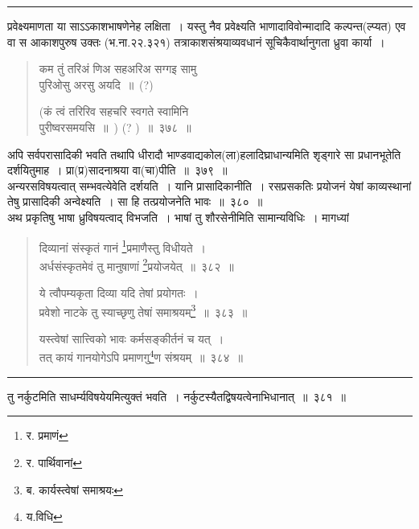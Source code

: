 \documentclass[11pt, openany]{book}
\begin{document}
\hrule

\vspace{2mm}
\noindent
प्रवेक्ष्यमाणता या साऽऽकाशभाषणेनेह लक्षिता~। यस्तु नैव प्रवेक्ष्यति भाणादाविवोन्मादादि कल्पन्त(ल्प्यत) एव वा स आकाशपुरुष उक्तः (भ.ना.२२.३२१) तत्राकाशसंश्रयाव्यवधानं सूचिकैवार्थानुगता ध्रुवा कार्या~।

\begin{quote}
{\qt कम तुं तरिअं णिअ सहअरिअ सग्गइ सामु \\
 पुरिओसु अरसु अयदि~॥~(?) 

 (कं त्वं तरिरिव सहचरि स्वगते स्वामिनि \\
 पुरीष्वरसमयसि~॥~) (? )~॥~३७८~॥}
\end{quote}

अपि सर्वपरासादिकी भवति तथापि धीरादौ भाण्डवाद्यकोल(ला)हलादिघ्राधान्यमिति शृड्गारे सा प्रधानभूतेति दर्शयितुमाह~। {\qtt प्रा(प्र)सादनाश्रया वा(चा)पीति}~॥~३७९~॥\\

अन्यरसविषयत्वात् सम्भवत्येवेति दर्शयति~। {\qtt यानि प्रासादिकानीति}~। रसप्रसकतिः प्रयोजनं येषां काव्यस्थानां तेषु प्रासादिकी अन्वेक्ष्यति~। सा हि तत्प्रयोजनेति भावः~॥~३८०~॥\\

अथ प्रकृतिषु भाषा ध्रुविषयत्वाद् विभजति~। {\qtt भाषां तु शौरसेनीमिति} सामान्यविधिः~। मागध्यां 

\newpage

\begin{quote}
{\na दिव्यानां संस्कृतं गानं \renewcommand{\thefootnote}{1}\footnote{र. प्रमाणं}प्रमाणैस्तु विधीयते~। \\
 अर्धसंस्कृतमेवं तु मानुषाणां \renewcommand{\thefootnote}{2}\footnote{र. पार्थिवानां}प्रयोजयेत्~॥~३८२~॥

 ये त्वौपम्यकृता दिव्या यदि तेषां प्रयोगतः~।\\
 प्रवेशो नाटके तु स्याच्छृणु तेषां समाश्रयम्\renewcommand{\thefootnote}{3}\footnote{ब. कार्यस्त्वेषां समाश्रयः}~॥~३८३~॥

 यस्त्वेषां सात्त्विको भावः कर्मसङ्कीर्तनं च यत्~।\\
 तत् कायं गानयोगेऽपि प्रमाणगु\renewcommand{\thefootnote}{4}\footnote{य.विधि}ण संश्रयम्~॥~३८४~॥}
\end{quote}

\hrule

\vspace{2mm}
\noindent
तु {\qtt नर्कुटमिति} साधर्म्यविषयेयमित्युक्तं भवति~। नर्कुटस्यैतद्विषयत्वेनाभिधानात्~॥~३८१~॥\\
\end{document}
